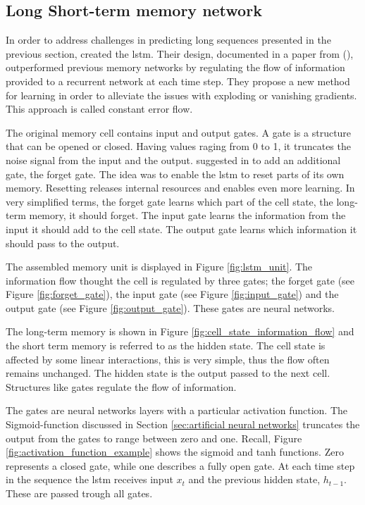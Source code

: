 \subsection{Long Short-term memory network} \label{sec:lstm}
In order to address challenges in predicting long sequences presented in the previous section, \citeauthor{Hochreiter1997LongMemory} created the \acrfull{lstm}. Their design, documented in a paper from \citeyear{Hochreiter1997LongMemory} (\cite{Hochreiter1997LongMemory}), outperformed previous memory networks by regulating the flow of information provided to a recurrent network at each time step.
They propose a new method for learning %
in order to alleviate the issues with exploding or vanishing gradients. This approach is called constant error flow. 

The original memory cell contains input and output gates. A gate is a structure that can be opened or closed. Having values raging from 0 to 1, it truncates the noise signal from the input and the output. \citeauthor{lstm_learning_to_forget} suggested in \citeyear{lstm_learning_to_forget} to add an additional gate, the forget gate. The idea was to enable the \acrshort{lstm} to reset parts of its own memory. Resetting releases internal resources and enables even more learning. In very simplified terms, the forget gate learns which part of the cell state, the long-term memory, it should forget. The input gate learns the information from the input it should add to the cell state. The output gate learns which information it should pass to the output. 

The assembled memory unit is displayed in Figure \ref{fig:lstm_unit}. The information flow thought the cell is regulated by three gates; the forget gate (see Figure \ref{fig:forget_gate}), the input gate (see Figure \ref{fig:input_gate}) and the output gate (see Figure \ref{fig:output_gate}). These gates are neural networks. 

The long-term memory is shown in Figure \ref{fig:cell_state_information_flow} and the short term memory is referred to as the hidden state. The cell state is affected by some linear interactions, this is very simple, thus the flow often remains unchanged. The hidden state is the output passed to the next cell. Structures like gates regulate the flow of information. 

The gates are neural networks layers with a particular activation function. The Sigmoid-function discussed in Section \ref{sec:artificial neural networks} truncates the output from the gates to range between zero and one. Recall, Figure \ref{fig:activation_function_example} shows the sigmoid and tanh functions. Zero represents a closed gate, while one describes a fully open gate. At each time step in the sequence the \acrshort{lstm} receives input $x_t$ and the previous hidden state, $h_{t-1}$. These are passed trough all gates.

